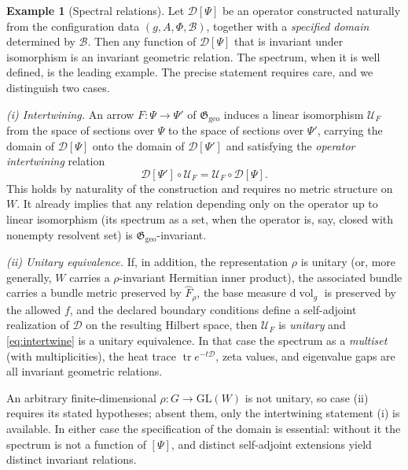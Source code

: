 \documentclass[11pt,a4paper]{article}
\theoremstyle{plain}
\theoremstyle{definition}
\newtheorem{example}[theorem]{Example}
\theoremstyle{remark}
\newcommand{\Ggeo}{\mathfrak{G}_{\mathrm{geo}}}
\newcommand{\dvol}{\mathrm{d}\!\operatorname{vol}_g}
\newcommand{\tr}{\operatorname{tr}}
\begin{document}
\begin{example}[Spectral relations]
\label{ex:spectral}
Let $\mathcal{D}[\Psi]$ be an operator constructed naturally from the configuration data
$(g,A,\Phi,\mathcal{B})$, together with a \emph{specified domain} determined by $\mathcal{B}$.
Then any function of
$\mathcal{D}[\Psi]$ that is invariant under isomorphism is an invariant geometric relation. The
spectrum, when it is well defined, is the leading example. The precise statement requires care,
and we distinguish two cases.

\emph{(i) Intertwining.} An arrow $F\colon\Psi\to\Psi'$ of $\Ggeo$ induces a linear isomorphism
$\mathcal{U}_F$ from the space of sections over $\Psi$ to the space of sections over $\Psi'$,
carrying the domain of $\mathcal{D}[\Psi]$ onto the domain of $\mathcal{D}[\Psi']$ and satisfying
the \emph{operator intertwining} relation
\begin{equation}
\label{eq:intertwine}
\mathcal{D}[\Psi']\circ\mathcal{U}_F=\mathcal{U}_F\circ\mathcal{D}[\Psi] .
\end{equation}
This holds by naturality of the construction and requires no metric structure on $W$. It already
implies that any relation depending only on the operator up to linear isomorphism (its spectrum as
a set, when the operator is, say, closed with nonempty resolvent set) is $\Ggeo$-invariant.

\emph{(ii) Unitary equivalence.} If, in addition, the representation $\rho$ is unitary (or, more
generally, $W$ carries a $\rho$-invariant Hermitian inner product), the associated bundle carries
a bundle metric preserved by $\hat F_\rho$, the base measure $\dvol$ is preserved by the allowed
$f$, and the declared boundary conditions define a self-adjoint realization of $\mathcal{D}$ on the
resulting Hilbert space, then $\mathcal{U}_F$ is \emph{unitary} and \eqref{eq:intertwine} is a
unitary equivalence. In that case the spectrum as a \emph{multiset} (with multiplicities), the
heat trace $\tr e^{-t\mathcal{D}}$, zeta values, and eigenvalue gaps are all invariant geometric
relations.

An arbitrary finite-dimensional $\rho\colon G\to\mathrm{GL}(W)$ is not unitary, so case (ii)
requires its stated hypotheses; absent them, only the intertwining statement (i) is available. In
either case the specification of the domain is essential: without it the spectrum is not a function
of $[\Psi]$, and distinct self-adjoint extensions yield distinct invariant relations.
\end{example}
\end{document}
